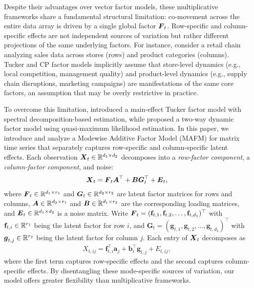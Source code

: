 \documentclass[11pt,letterpaper]{article}
\newcommand{\bfm}[1]{\ensuremath{\boldsymbol{#1}}} %
\def\ba{\bfm a}   \def\bA{\bfm A}  \def\AA{\mathbb{A}}
\def\bb{\bfm b}   \def\bB{\bfm B}  \def\BB{\mathbb{B}}
\def\bg{\bfm g}   \def\bG{\bfm G}  \def\GG{\mathbb{G}}
\theoremstyle{definition}
\newcommand{\bfv}{\mathbf{f}}
\begin{document}
Despite their advantages over vector factor models, these multiplicative frameworks share a fundamental structural limitation: co-movement across the entire data array is driven by a single global factor $\bF_t$. Row-specific and column-specific effects are not independent sources of variation but rather different projections of the same underlying factors. For instance, consider a retail chain analyzing sales data across stores (rows) and product categories (columns). Tucker and CP factor models implicitly assume that store-level dynamics (e.g., local competition, management quality) and product-level dynamics (e.g., supply chain disruptions, marketing campaigns) are manifestations of the same core factors, an assumption that may be overly restrictive in practice.



To overcome this limitation, \cite{lam2025matrix} introduced a main-effect Tucker factor model with spectral decomposition-based estimation, while \cite{yuan2023twoway} proposed a two-way dynamic factor model using quasi-maximum likelihood estimation. In this paper, we introduce and analyze a Modewise Additive Factor Model (MAFM) for matrix time series that separately captures row-specific and column-specific latent effects. Each observation $\bX_t \in \RR^{d_1 \times d_2}$ decomposes into a \emph{row-factor component}, a \emph{column-factor component}, and noise: 
\begin{equation}\label{eqn: factor model}
\bX_t = \bF_t \bA^\top + \bB \bG_t^\top + \bE_t,
\end{equation}
where $\bF_t \in \RR^{d_1 \times r_1}$ and $\bG_t \in \RR^{d_2 \times r_2}$ are latent factor matrices for rows and columns, $\bA \in \RR^{d_2 \times r_1}$ and $\bB \in \RR^{d_1 \times r_2}$ are the corresponding loading matrices, and $\bE_t \in \RR^{d_1 \times d_2}$ is a noise matrix. Write $\bF_t = (\bfv_{t,1},\bfv_{t,2},\dots,\bfv_{t,d_1})^\top$ with $\bfv_{t,i}\in\RR^{r_1}$ being the latent factor for row $i$, and $\bG_t = (\bg_{t,1},\bg_{t,2},\dots,\bg_{t,d_2})^\top$ with $\bg_{t,j}\in\RR^{r_2}$ being the latent factor for column $j$. 
Each entry of $\bX_t$ decomposes as
\begin{align*}
X_{t,ij} = \bfv_{t,i}^\top \ba_j + \bb_i^\top \bg_{t,j} + E_{t,ij},    
\end{align*}
where the first term captures row-specific effects and the second captures column-specific effects. By disentangling these mode-specific sources of variation, our model offers greater flexibility than multiplicative frameworks.
\end{document}
